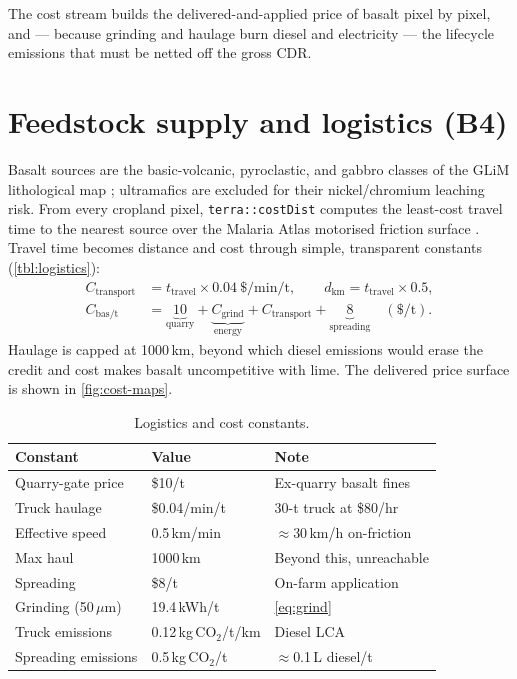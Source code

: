 \documentclass[openany]{book}
\newcommand{\co}{\ensuremath{\mathrm{CO_2}}}
\newcommand{\um}{\ensuremath{\mu\mathrm{m}}}
\begin{document}
The cost stream builds the delivered-and-applied price of basalt pixel by pixel,
and --- because grinding and haulage burn diesel and electricity --- the
lifecycle emissions that must be netted off the gross CDR.

\section{Feedstock supply and logistics (B4)}

Basalt sources are the basic-volcanic, pyroclastic, and gabbro classes of the
GLiM lithological map \citep{hartmann2012}; ultramafics are excluded for their
nickel/chromium leaching risk. From every cropland pixel, \texttt{terra::costDist}
computes the least-cost travel time to the nearest source over the Malaria Atlas
motorised friction surface \citep{weiss2020}. Travel time becomes distance and
cost through simple, transparent constants (\autoref{tbl:logistics}):
%
\begin{align}
C_{\text{transport}} &= t_{\text{travel}} \times 0.04\ \text{\$/min/t},
\qquad
d_{\text{km}} = t_{\text{travel}} \times 0.5, \label{eq:transport}\\
C_{\text{bas/t}} &= \underbrace{10}_{\text{quarry}}
 + \underbrace{C_{\text{grind}}}_{\text{energy}}
 + C_{\text{transport}}
 + \underbrace{8}_{\text{spreading}}\quad(\text{\$/t}). \label{eq:cbas}
\end{align}
%
Haulage is capped at 1000\,km, beyond which diesel emissions would erase the
credit and cost makes basalt uncompetitive with lime. The delivered price
surface is shown in \autoref{fig:cost-maps}.

\begin{longtable}[]{@{}lll@{}}
\caption{Logistics and cost constants.}\label{tbl:logistics}\\
\toprule
Constant & Value & Note \\
\midrule
\endhead
Quarry-gate price & \$10/t & Ex-quarry basalt fines \\
Truck haulage & \$0.04/min/t & 30-t truck at \$80/hr \\
Effective speed & 0.5\,km/min & $\approx$30\,km/h on-friction \\
Max haul & 1000\,km & Beyond this, unreachable \\
Spreading & \$8/t & On-farm application \\
Grinding (50\,\um) & 19.4\,kWh/t & \autoref{eq:grind} \\
Truck emissions & 0.12\,kg\,\co/t/km & Diesel LCA \\
Spreading emissions & 0.5\,kg\,\co/t & $\approx$0.1\,L diesel/t \\
\bottomrule
\end{longtable}
\end{document}

